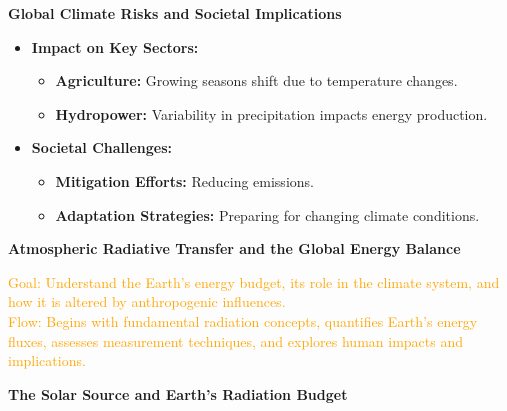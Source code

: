 \documentclass[fontsize=8pt, a4paper, landscape, fleqn]{scrartcl}
\renewcommand{\section}[1]{%
    \noindent\colorbox{sectioncolor}{%
        \parbox{\dimexpr\columnwidth-2\fboxsep}{\color{white}\textbf{#1}}}%
    \vspace{0.5mm}%
}
\renewcommand{\subsection}[1]{%
    \noindent\colorbox{subsectioncolor}{%
        \parbox{\dimexpr\columnwidth-2\fboxsep}{\color{white}\textbf{#1}}}%
    \vspace{0.5mm}%
}
\begin{document}
\begin{multicols*}{3}[\raggedcolumns]
\subsection{Global Climate Risks and Societal Implications}
\begin{itemize}
    \item \textbf{Impact on Key Sectors:}
    \begin{itemize}
        \item \textbf{Agriculture:} Growing seasons shift due to temperature changes.
        \item \textbf{Hydropower:} Variability in precipitation impacts energy production.
    \end{itemize}
    \item \textbf{Societal Challenges:}
    \begin{itemize}
        \item \textbf{Mitigation Efforts:} Reducing emissions.
        \item \textbf{Adaptation Strategies:} Preparing for changing climate conditions.
    \end{itemize}
\end{itemize}

\section{Atmospheric Radiative Transfer and the Global Energy Balance}
\noindent\textcolor{orange}{
Goal: Understand the Earth's energy budget, its role in the climate system, and how it is altered by anthropogenic influences.\\
Flow: Begins with fundamental radiation concepts, quantifies Earth's energy fluxes, assesses measurement techniques, and explores human impacts and implications.
}

\subsection{The Solar Source and Earth's Radiation Budget}


\end{multicols*}
\end{document}
